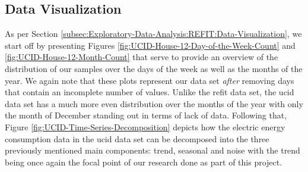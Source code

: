 \subsection{Data Visualization}
\label{subsec:Exploratory-Data-Analysis:UCID:Data-Visualization}
As per Section \ref{subsec:Exploratory-Data-Analysis:REFIT:Data-Visualization}, we start off by presenting Figures \ref{fig:UCID-House-12-Day-of-the-Week-Count} and \ref{fig:UCID-House-12-Month-Count} that serve to provide an overview of the distribution of our samples over the days of the week as well as the months of the year. We again note that these plots represent our data set \textit{after} removing days that contain an incomplete number of values. Unlike the \gls{refit} data set, the \gls{ucid} data set has a much more even distribution over the months of the year with only the month of December standing out in terms of lack of data. Following that, Figure \ref{fig:UCID-Time-Series-Decomposition} depicts how the electric energy consumption data in the \gls{ucid} data set can be decomposed into the three previously mentioned main components: trend, seasonal and noise with the trend being once again the focal point of our research done as part of this project.

